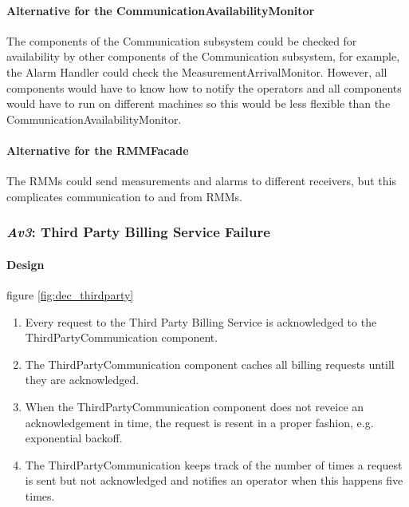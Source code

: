 \documentclass[a4paper,10pt]{article}
\begin{document}
\paragraph{Alternative for the CommunicationAvailabilityMonitor} The components of the Communication subsystem could be checked for availability by other components of the Communication subsystem, for example, the Alarm Handler could check the MeasurementArrivalMonitor. However, all components would have to know how to notify the operators and all components would have to run on different machines so this would be less flexible than the CommunicationAvailabilityMonitor.

\paragraph{Alternative for the RMMFacade} The RMMs could send measurements and alarms to different receivers, but this complicates communication to and from RMMs.


\subsubsection{\emph{Av3}: Third Party Billing Service Failure}

\paragraph{Design} figure \ref{fig:dec_thirdparty}

\begin{enumerate}
	\item Every request to the Third Party Billing Service is acknowledged to the ThirdPartyCommunication component.
    \item The ThirdPartyCommunication component caches all billing requests untill they are acknowledged.
    \item When the ThirdPartyCommunication component does not reveice an acknowledgement in time, the request is resent in a proper fashion, e.g. exponential backoff.
    \item The ThirdPartyCommunication keeps track of the number of times a request is sent but not acknowledged and notifies an operator when this happens five times.
\end{enumerate}
\end{document}
